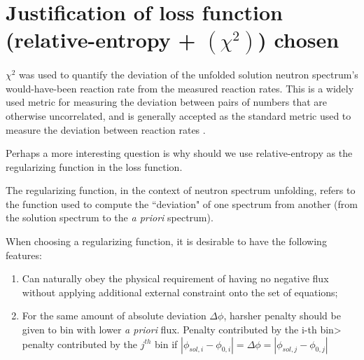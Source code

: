 \documentclass[a4paper, 12pt]{article}
\newcommand{\apriori}[0]{\textit{a priori} }
\begin{document}
\section{Justification of loss function (relative-entropy + $(\chi^2)$) chosen}\label{justification}
    $\chi^2$ was used to quantify the deviation of the unfolded solution neutron spectrum's would-have-been reaction rate from the measured reaction rates.
    This is a widely used metric for measuring the deviation between pairs of numbers that are otherwise uncorrelated, and is generally accepted as the standard metric used to measure the deviation between reaction rates \cite{MatzkeUnfoldingProcedure}\cite{Linden1995_Article_Maximum-entropyDataAnalysis}.

    Perhaps a more interesting question is why should we use relative-entropy as the regularizing function in the loss function.

    The regularizing function, in the context of neutron spectrum unfolding, refers to the function used to compute the ``deviation" of one spectrum from another (from the solution spectrum to the \apriori spectrum).

    When choosing a regularizing function, it is desirable to have the following features:
\begin{enumerate}
    \item Can naturally obey the physical requirement of having no negative flux without applying additional external constraint onto the set of equations;
    \item For the same amount of absolute deviation $\Delta \phi$, harsher penalty should be given to bin with lower \apriori flux.
        Penalty contributed by the i-th bin> penalty contributed by the $j^{th}$ bin if $|\phi_{sol,i}-\phi_{0,i}|=\Delta\phi=|\phi_{sol,j}-\phi_{0,j}|$
\end{enumerate}
\end{document}
